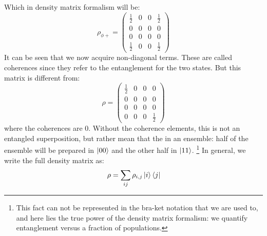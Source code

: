 Which in density matrix formalism will be:
\begin{equation}
    \rho_{\phi+} = 
    \begin{pmatrix}
        \frac{1}{2} & 0 & 0 & \frac{1}{2} \\
        0 & 0 & 0 & 0 \\
        0 & 0 & 0 & 0 \\
        \frac{1}{2} & 0 & 0 & \frac{1}{2}
    \end{pmatrix}
\end{equation}
It can be seen that we now acquire non-diagonal terms. These are called coherences since they refer to the entanglement for the two states.  But this matrix is different from: 
\begin{equation}
    \rho = 
    \begin{pmatrix}
        \frac{1}{2} & 0 & 0 & 0 \\
        0 & 0 & 0 & 0 \\
        0 & 0 & 0 & 0 \\
        0 & 0 & 0 & \frac{1}{2}
    \end{pmatrix}
\end{equation}
where the coherences are $0$. Without the coherence elements, this is not an entangled superposition, but rather mean that the in an ensemble: half of the ensemble will be prepared in $\ket{00}$ and the other half in $\ket{11}$. \footnote{This fact can not be represented in the bra-ket notation that we are used to, and here lies the true power of the density matrix formalism: we quantify entanglement versus a fraction of populations.}
In general, we write the full density matrix as:
\begin{equation}
    \rho = \sum_{ij} \rho_{i,j} \ket{i}\bra{j}
\end{equation}

